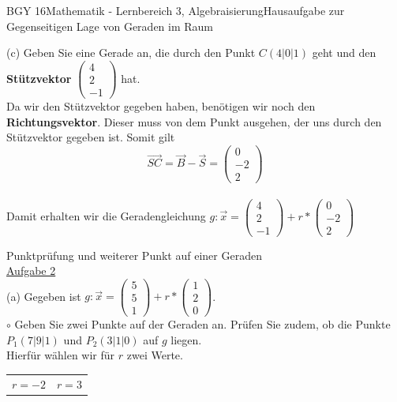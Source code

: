 \documentclass[oneside,openany,headings=optiontotoc,11pt,numbers=noenddot]{scrreprt}
\begin{document}
\begin{worksheet}{BGY 16}{Mathematik - Lernbereich 3, Algebraisierung}{Hausaufgabe zur Gegenseitigen Lage von Geraden im Raum}
\begin{framed}
			\noindent
			(c) Geben Sie eine Gerade an, die durch den Punkt \(C(4|0|1)\) geht und den \textbf{Stützvektor} \(\left(\begin{array}{c}4\\2\\-1\end{array}\right)\) hat.\\
			Da wir den Stützvektor gegeben haben, benötigen wir noch den \textbf{Richtungsvektor}. Dieser muss von dem Punkt ausgehen, der uns durch den Stützvektor gegeben ist. Somit gilt \[\vec{SC} = \vec{B} - \vec{S} = \left(\begin{array}{c}0\\-2\\2\end{array}\right)\]\\
			Damit erhalten wir die Geradengleichung \(g:\vec{x} = \left(\begin{array}{c}4\\2\\-1\end{array}\right) + r*\left(\begin{array}{c}0\\-2\\2\end{array}\right)\)
		\end{framed}
		\begin{framed}
			\tiny{\color{codegray}Punktprüfung und weiterer Punkt auf einer Geraden}\\
			\normalsize\normalcolor
			\underline{Aufgabe 2}\\
			(a) Gegeben ist \(g:\vec{x} = \left(\begin{array}{c}5\\5\\1\end{array}\right) + r*\left(\begin{array}{c}1\\2\\0\end{array}\right)\).\\
			\(\circ\) Geben Sie zwei Punkte auf der Geraden an. Prüfen Sie zudem, ob die Punkte \(P_1(7|9|1)\) und \(P_2(3|1|0)\) auf \(g\) liegen.\\
			Hierfür wählen wir für \(r\) zwei Werte.\\
			\par\bigskip\noindent
			\begin{tabularx}{\textwidth}{X|X}
				\(r=-2\) & \(r=3\)\\

\end{tabularx}
\end{framed}
\end{worksheet}
\end{document}

